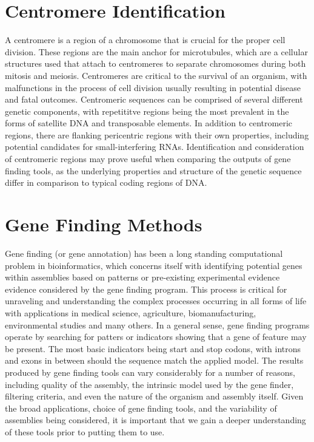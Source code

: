\section{Centromere Identification}
A centromere is a region of a chromosome that is crucial for the
proper cell division. These regions are the main anchor for
microtubules, which are a cellular structures used that attach to
centromeres to separate chromosomes during both mitosis and
meiosis. Centromeres are critical to the survival of an organism, with
malfunctions in the process of cell division usually resulting in
potential disease and fatal outcomes\cite{Plohl2014}. Centromeric
sequences can be comprised of several different genetic components,
with repetititve regions being the most prevalent in the forms of
satellite DNA and transposable elements. In addition to centromeric
regions, there are flanking pericentric regions with their own
properties, including potential candidates for small-interfering
RNAs\cite{Plohl2014}. Identification and consideration of centromeric
regions may prove useful when comparing the outputs of gene finding
tools, as the underlying properties and structure of the genetic
sequence differ in comparison to typical coding regions of DNA.

\section{Gene Finding Methods}
Gene finding (or gene annotation) has been a long standing
computational problem in bioinformatics, which concerns itself with
identifying potential genes within assemblies based on patterns or
pre-existing experimental evidence evidence considered by the gene
finding program. This process is critical for unraveling and
understanding the complex processes occurring in all forms of life
with applications in medical science, agriculture, biomanufacturing,
environmental studies and many others. In a general sense, gene
finding programs operate by searching for patters or indicators
showing that a gene of feature may be present. The most basic
indicators being start and stop codons, with introns and exons in
between should the sequence match the applied model. The results
produced by gene finding tools can vary considerably for a number of
reasons, including quality of the assembly, the intrinsic model used
by the gene finder, filtering criteria, and even the nature of the
organism and assembly itself. Given the broad applications, choice of
gene finding tools, and the variability of assemblies being
considered, it is important that we gain a deeper understanding of
these tools prior to putting them to use.

